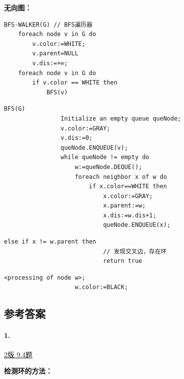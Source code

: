 \documentclass{article}
\begin{document}
\pagebreak

\textbf{无向图：\\}
\begin{lstlisting}[style=algorithmPPT]
    BFS-WALKER(G) // BFS遍历器
    foreach node v in G do
        v.color:=WHITE; 
        v.parent=NULL 
        v.dis:=+∞;
    foreach node v in G do
        if v.color == WHITE then
            BFS(v)
\end{lstlisting}

\begin{lstlisting}[style=algorithmPPT]
            BFS(G)
                Initialize an empty queue queNode;
                v.color:=GRAY;
                v.dis:=0;
                queNode.ENQUEUE(v);
                while queNode != empty do
                    w:=queNode.DEQUE();
                    foreach neighbor x of w do
                        if x.color==WHITE then
                            x.color:=GRAY;
                            x.parent:=w;
                            x.dis:=w.dis+1;
                            queNode.ENQUEUE(x);
                    \end{lstlisting}

\begin{lstlisting}[style=algorithm]
                        else if x != w.parent then
                            // 发现交叉边，存在环
                            return true
                        \end{lstlisting}

\begin{lstlisting}[style=algorithmPPT]
                    <processing of node w>;
                    w.color:=BLACK;
\end{lstlisting}

\pagebreak

\subsection{参考答案}

\paragraph{1.}

\href{https://github.com/Shannju/njucser_helphelp/blob/main/Algorithm%E7%AE%97%E6%B3%95/%E7%AD%94%E6%A1%88/P4~7.pdf}{2版 9.4题}

\noindent\textbf{检测环的方法：}
\end{document}
